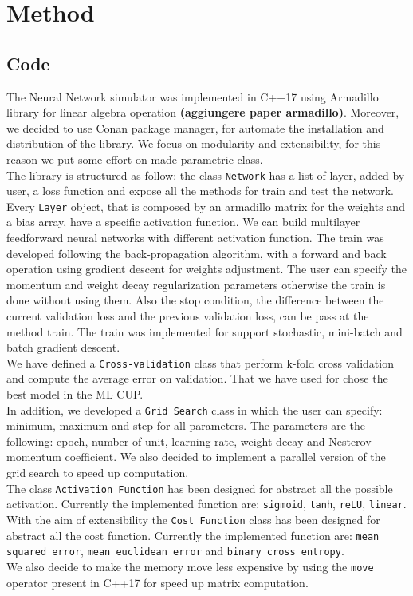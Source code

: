 \section{Method}

\subsection{Code}
The Neural Network simulator was implemented in C++17 using Armadillo library for linear algebra operation \textbf{(aggiungere paper armadillo)}. Moreover, we decided to use Conan package manager, for automate the installation and distribution of the library. We focus on modularity and extensibility, for this reason we put some effort on made parametric class.
\\
The library is structured as follow:
the class \texttt{Network} has a list of layer, added by user, a loss function and expose all the methods for train and test the network. Every \texttt{Layer} object, that is composed by an armadillo matrix for the weights and a bias array, have a specific activation function. We can build  multilayer feedforward neural networks with different activation function. The train was developed following the back-propagation algorithm, with a forward and back operation using gradient descent for weights adjustment. The user can specify the momentum and weight decay regularization parameters otherwise the train is done without using them. Also the stop condition, the difference between the current validation loss and the previous validation loss, can be pass at the method train. The train was implemented for support stochastic, mini-batch and batch gradient descent.
\\
We have defined a \texttt{Cross-validation} class that perform k-fold cross validation and compute the average error on validation. That we have used for chose the best model in the ML CUP.
\\
In addition, we developed a \texttt{Grid Search} class in which the user can specify: minimum, maximum and step for all parameters. The parameters are the following: epoch, number of unit, learning rate, weight decay and Nesterov momentum coefficient. We also decided to implement a parallel version of the grid search to speed up computation. 
\\
The class \texttt{Activation Function} has been designed for abstract all the possible activation. Currently the implemented function are: \texttt{sigmoid}, \texttt{tanh}, \texttt{reLU}, \texttt{linear}.
With the aim of extensibility the \texttt{Cost Function} class has been designed for abstract all the cost function.
Currently the implemented function are: \texttt{mean squared error}, \texttt{mean euclidean error} and \texttt{binary cross entropy}.
\\
We also decide to make the memory move less expensive by using the \texttt{move} operator present in C++17 for speed up matrix computation.

